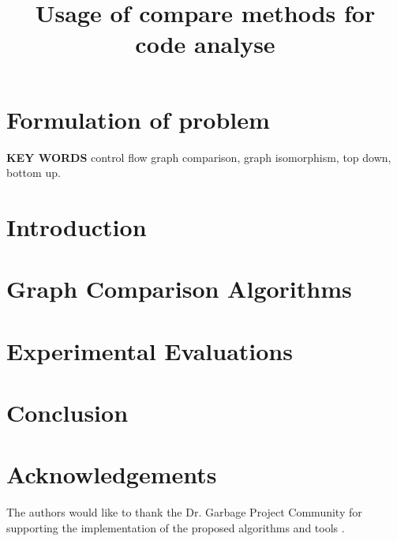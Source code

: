 \documentclass[twocolumn,letterpaper,10pt]{article}
\begin{document}
\date{}

\title{Usage of compare methods for code analyse }

%


\maketitle
\thispagestyle{empty}

\section{Formulation of problem}


%   
   
\noindent
{\bf\normalsize KEY WORDS}\newline
{control flow graph comparison, graph isomorphism, top down, bottom up.}

\section{Introduction}


\section{Graph Comparison Algorithms}


\section{\label{experimental_results}Experimental Evaluations}


\section{Conclusion} 


\section{Acknowledgements} 
The authors would like to thank the Dr. Garbage Project Community for supporting the implementation of the proposed algorithms and tools \cite{drgarbage_project}.


\end{document}
